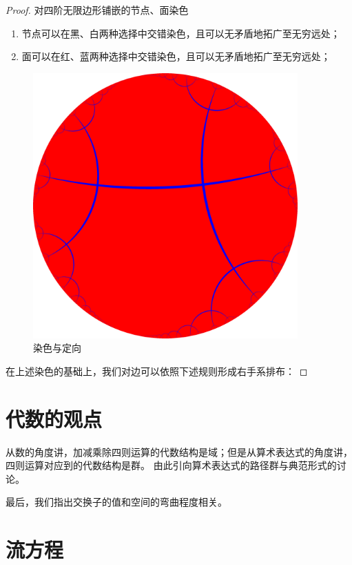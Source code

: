 \documentclass[a4paper,12pt]{article}
\begin{document}
\begin{proof}
对四阶无限边形铺嵌的节点、面染色
\begin{enumerate}
    \item 节点可以在黑、白两种选择中交错染色，且可以无矛盾地拓广至无穷远处；
    \item 面可以在红、蓝两种选择中交错染色，且可以无矛盾地拓广至无穷远处；
\end{enumerate}

\begin{figure}[ht]
\centering
\includegraphics[width=4in]{images/H2_tiling_24i-1.png}
\caption{染色与定向}
\end{figure}

在上述染色的基础上，我们对边可以依照下述规则形成右手系排布：

\end{proof}

\newpage

\section{代数的观点}

从数的角度讲，加减乘除四则运算的代数结构是域；但是从算术表达式的角度讲，四则运算对应到的代数结构是群。
由此引向算术表达式的路径群与典范形式的讨论。

最后，我们指出交换子的值和空间的弯曲程度相关。

\section{流方程}
\end{document}
